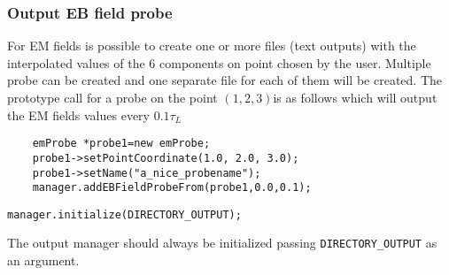 \documentclass[11pt,a4paper]{report}
\begin{document}
\subsubsection{Output EB field probe}\label{em_probe}
For EM fields is possible to create one or more files (text outputs) with the interpolated values of the 6 components on point chosen by the user. Multiple probe can be created and one separate file for each of them will be created.
The prototype call for a probe on the point $(1,2,3)$is as follows which will output the EM fields values every $0.1\tau_L$

\begin{lstlisting}
	emProbe *probe1=new emProbe;
	probe1->setPointCoordinate(1.0, 2.0, 3.0);
	probe1->setName("a_nice_probename");
	manager.addEBFieldProbeFrom(probe1,0.0,0.1);
\end{lstlisting}

\begin{lstlisting}[backgroundcolor=\color{no_modify}]
	manager.initialize(DIRECTORY_OUTPUT);
\end{lstlisting}
The output manager should always be initialized passing \verb+DIRECTORY_OUTPUT+
as an argument. 
\end{document}
